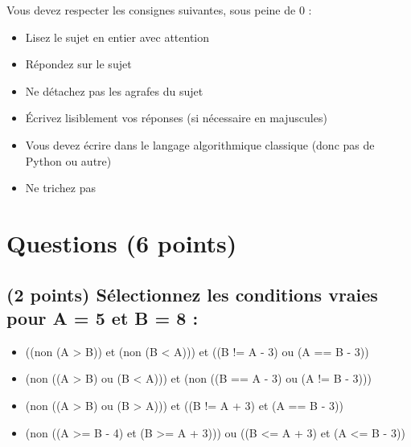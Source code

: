 \documentclass[11pt,a4paper]{article}
\begin{document}
\MakeExamTitle                   %


\bigskip

Vous devez respecter les consignes suivantes, sous peine de 0 :

\begin{itemize}
\item Lisez le sujet en entier avec attention
\item Répondez sur le sujet
\item Ne détachez pas les agrafes du sujet
\item \'Ecrivez lisiblement vos réponses (si nécessaire en majuscules)
\item Vous devez écrire dans le langage algorithmique classique (donc pas de Python ou autre)
\item Ne trichez pas
\end{itemize}



\section{Questions (6 points)}

\subsection{(2 points) Sélectionnez les conditions vraies pour A = 5 et B = 8 : }

\bigskip

\begin{itemize}
  \item[\checkmark] ((non (A > B)) et (non (B < A))) et ((B != A - 3) ou (A == B - 3)) \\ %
  \item[\checkmark] (non ((A > B) ou (B < A))) et (non ((B == A - 3) ou (A != B - 3))) \\ %
  \item[\CaseCoche] (non ((A > B) ou (B > A))) et ((B != A + 3) et (A == B - 3)) \\ %
  \item[\checkmark] (non ((A >= B - 4) et (B >= A + 3))) ou ((B <= A + 3) et (A <= B - 3)) \\ %
\end{itemize}
\end{document}
